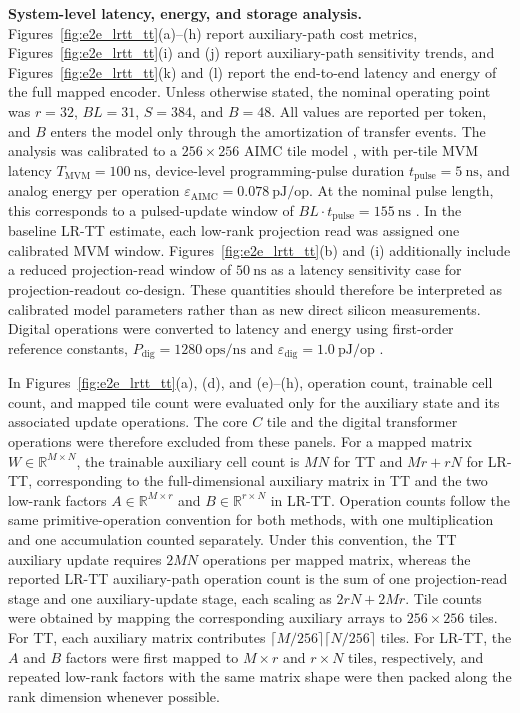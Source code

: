 \documentclass[AMA,LATO2COL]{WileyNJDv5}
\begin{document}
\noindent\textbf{System-level latency, energy, and storage analysis.}
Figures~\ref{fig:e2e_lrtt_tt}(a)--(h) report auxiliary-path cost metrics, Figures~\ref{fig:e2e_lrtt_tt}(i) and (j) report auxiliary-path sensitivity trends, and Figures~\ref{fig:e2e_lrtt_tt}(k) and (l) report the end-to-end latency and energy of the full mapped encoder. Unless otherwise stated, the nominal operating point was \(r=32\), \(BL=31\), \(S=384\), and \(B=48\). All values are reported per token, and \(B\) enters the model only through the amortization of transfer events. The analysis was calibrated to a \(256\times256\) AIMC tile model \cite{klein2023alpine}, with per-tile MVM latency \(T_{\mathrm{MVM}}=100~\mathrm{ns}\), device-level programming-pulse duration \(t_{\mathrm{pulse}}=5~\mathrm{ns}\), and analog energy per operation \(\varepsilon_{\mathrm{AIMC}}=0.078~\mathrm{pJ/op}\). At the nominal pulse length, this corresponds to a pulsed-update window of \(BL\cdot t_{\mathrm{pulse}}=155~\mathrm{ns}\) \cite{rasch2024fastrobust}. In the baseline LR-TT estimate, each low-rank projection read was assigned one calibrated MVM window. Figures~\ref{fig:e2e_lrtt_tt}(b) and (i) additionally include a reduced projection-read window of \(50~\mathrm{ns}\) as a latency sensitivity case for projection-readout co-design. These quantities should therefore be interpreted as calibrated model parameters rather than as new direct silicon measurements. Digital operations were converted to latency and energy using first-order reference constants, \(P_{\mathrm{dig}}=1280~\mathrm{ops/ns}\) and \(\varepsilon_{\mathrm{dig}}=1.0~\mathrm{pJ/op}\) \cite{chen2025albertanalog,horowitz2014computing}.

\noindent
In Figures~\ref{fig:e2e_lrtt_tt}(a), (d), and (e)--(h), operation count, trainable cell count, and mapped tile count were evaluated only for the auxiliary state and its associated update operations. The core \(C\) tile and the digital transformer operations were therefore excluded from these panels. For a mapped matrix \(W\in\mathbb{R}^{M\times N}\), the trainable auxiliary cell count is \(MN\) for TT and \(Mr+rN\) for LR-TT, corresponding to the full-dimensional auxiliary matrix in TT and the two low-rank factors \(A\in\mathbb{R}^{M\times r}\) and \(B\in\mathbb{R}^{r\times N}\) in LR-TT. Operation counts follow the same primitive-operation convention for both methods, with one multiplication and one accumulation counted separately. Under this convention, the TT auxiliary update requires \(2MN\) operations per mapped matrix, whereas the reported LR-TT auxiliary-path operation count is the sum of one projection-read stage and one auxiliary-update stage, each scaling as \(2rN+2Mr\). Tile counts were obtained by mapping the corresponding auxiliary arrays to \(256\times256\) tiles. For TT, each auxiliary matrix contributes \(\lceil M/256\rceil\lceil N/256\rceil\) tiles. For LR-TT, the \(A\) and \(B\) factors were first mapped to \(M\times r\) and \(r\times N\) tiles, respectively, and repeated low-rank factors with the same matrix shape were then packed along the rank dimension whenever possible.
\end{document}
